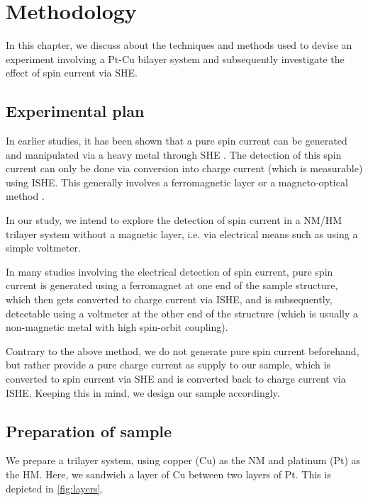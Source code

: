 \chapter{Methodology}

\label{chapter4}

In this chapter, we discuss about the techniques and methods used to devise an experiment involving a Pt-Cu bilayer system and subsequently investigate the effect of spin current via SHE.

\section{Experimental plan} \label{sec:plan}

In earlier studies, it has been shown that a pure spin current can be generated and manipulated via a heavy metal through SHE \cite{hirsch1999spin,sinova2004universal,zhang2000spin}. The detection of this spin current can only be done via conversion into charge current (which is measurable) using ISHE. This generally involves a ferromagnetic layer or a magneto-optical method \cite{kimura2007room,li2019spin,stamm2017magneto,valenzuela2007electrical}.

In our study, we intend to explore the detection of spin current in a NM/HM trilayer system without a magnetic layer, i.e. via electrical means such as using a simple voltmeter.

In many studies involving the electrical detection of spin current, pure spin current is generated using a ferromagnet at one end of the sample structure, which then gets converted to charge current via ISHE, and is subsequently, detectable using a voltmeter at the other end of the structure (which is usually a non-magnetic metal with high spin-orbit coupling).

Contrary to the above method, we do not generate pure spin current beforehand, but rather provide a pure charge current as supply to our sample, which is converted to spin current via SHE and is converted back to charge current via ISHE. Keeping this in mind, we design our sample accordingly.

\section{Preparation of sample}

We prepare a trilayer system, using copper (Cu) as the NM and platinum (Pt) as the HM. Here, we sandwich a layer of Cu between two layers of Pt. This is depicted in \cref{fig:layers}.

